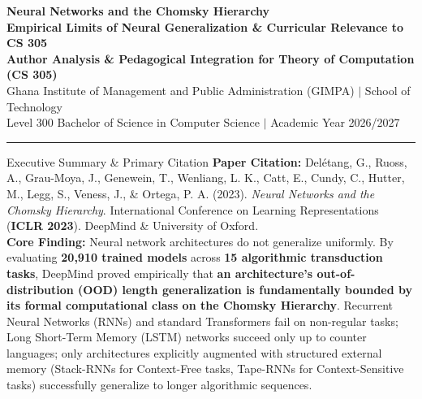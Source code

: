 \documentclass[11pt,a4paper]{article}
\begin{document}
\begin{center}
    {\LARGE\bfseries\color{gimpanavy} Neural Networks and the Chomsky Hierarchy}\\[4pt]
    {\large\bfseries\color{gimpaaccent} Empirical Limits of Neural Generalization \& Curricular Relevance to CS 305}\\[8pt]
    {\normalsize\textbf{Author Analysis \& Pedagogical Integration for Theory of Computation (CS 305)}}\\[3pt]
    {\small Ghana Institute of Management and Public Administration (GIMPA) $|$ School of Technology}\\
    {\small Level 300 Bachelor of Science in Computer Science $|$ Academic Year 2026/2027}\\[8pt]
    \rule{0.85\linewidth}{0.6pt}
\end{center}

\vspace{-6pt}
\begin{takeawaybox}{Executive Summary \& Primary Citation}
\textbf{Paper Citation:} Del{\'e}tang, G., Ruoss, A., Grau-Moya, J., Genewein, T., Wenliang, L. K., Catt, E., Cundy, C., Hutter, M., Legg, S., Veness, J., \& Ortega, P. A. (2023). \textit{Neural Networks and the Chomsky Hierarchy}. International Conference on Learning Representations (\textbf{ICLR 2023}). DeepMind \& University of Oxford.\\
\textbf{Core Finding:} Neural network architectures do not generalize uniformly. By evaluating \textbf{20,910 trained models} across \textbf{15 algorithmic transduction tasks}, DeepMind proved empirically that \textbf{an architecture's out-of-distribution (OOD) length generalization is fundamentally bounded by its formal computational class on the Chomsky Hierarchy}. Recurrent Neural Networks (RNNs) and standard Transformers fail on non-regular tasks; Long Short-Term Memory (LSTM) networks succeed only up to counter languages; only architectures explicitly augmented with structured external memory (Stack-RNNs for Context-Free tasks, Tape-RNNs for Context-Sensitive tasks) successfully generalize to longer algorithmic sequences.
\end{takeawaybox}

\end{document}
